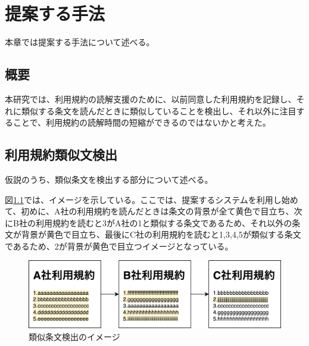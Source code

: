 \chapter{提案する手法}
\label{proposed}

本章では提案する手法について述べる。

\section{概要}
本研究では、利用規約の読解支援のために、以前同意した利用規約を記録し、それに類似する条文を読んだときに類似していることを検出し、それ以外に注目することで、利用規約の読解時間の短縮ができるのではないかと考えた。

\section{利用規約類似文検出}
\label{sub:利用規約類似文検出}
仮説のうち、類似条文を検出する部分について述べる。

図\ref{img:demo}では、イメージを示している。ここでは、提案するシステムを利用し始めて、初めに、A社の利用規約を読んだときは条文の背景が全て黄色で目立ち、次にB社の利用規約を読むと3がA社の1と類似する条文であるため、それ以外の条文が背景が黄色で目立ち、最後にC社の利用規約を読むと1,3,4,5が類似する条文であるため、2が背景が黄色で目立つイメージとなっている。
\begin{figure}[h]
  \begin{center}
      \includegraphics[width=15cm]{img/demo.drawio.png}
      \caption{類似条文検出のイメージ}
      \label{img:demo}
  \end{center}
\end{figure}

